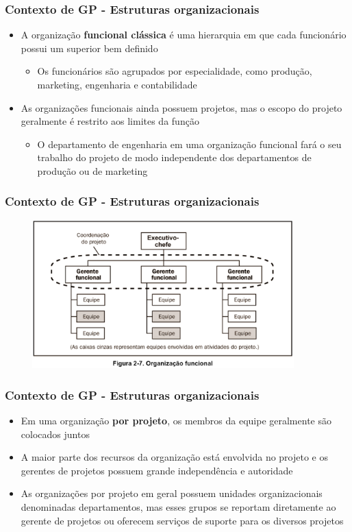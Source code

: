 \begin{frame}
   \frametitle{Contexto de GP
- Estruturas organizacionais}
   \begin{itemize}
    \item A organização \textbf{funcional clássica} é uma hierarquia em que cada funcionário possui um superior bem definido
    \begin{itemize}
     \item Os funcionários são agrupados por especialidade, como produção, marketing, engenharia e contabilidade
    \end{itemize}
    \item As organizações funcionais ainda possuem projetos, mas o escopo do projeto geralmente é restrito aos limites da função
    \begin{itemize}
     \item O departamento de engenharia em uma organização funcional fará o seu trabalho do projeto de modo independente dos departamentos de produção ou de marketing
    \end{itemize}
   \end{itemize}
  \end{frame}
  
\begin{frame}
 \frametitle{Contexto de GP - Estruturas organizacionais}
 \begin{figure}
  \centering
  \includegraphics[width = 0.9\textwidth]{figs/fig1.png}
 \end{figure}
\end{frame}

\begin{frame}
   \frametitle{Contexto de GP
- Estruturas organizacionais}
   \begin{itemize}
    \item Em uma organização \textbf{por projeto}, os membros da equipe geralmente são colocados juntos
    \item A maior parte dos recursos da organização está envolvida no projeto e os gerentes de projetos possuem grande independência e autoridade
    \item As organizações por projeto em geral possuem unidades organizacionais denominadas departamentos, mas esses grupos se reportam diretamente ao gerente de projetos ou oferecem serviços de suporte para os diversos projetos
   \end{itemize}
  \end{frame}


